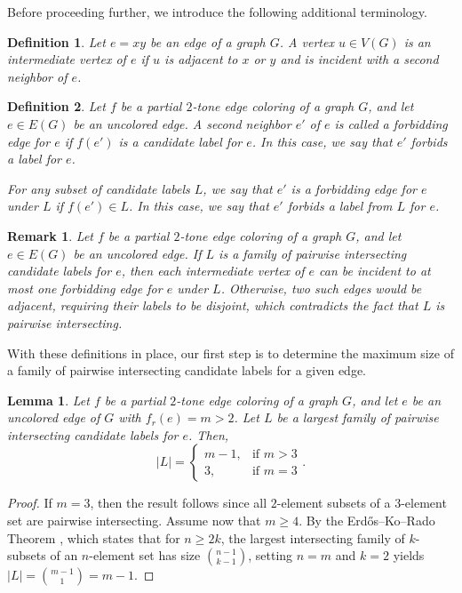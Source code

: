 \documentclass[12pt]{article}
\theoremstyle{plain}
\numberwithin{theorem}{section}
\numberwithin{conjecture}{section}
\numberwithin{corollary}{section}
\numberwithin{example}{section}
\newtheorem{lemma}{Lemma}
\numberwithin{lemma}{section}
\numberwithin{proposition}{section}
\numberwithin{problem}{section}
\newtheorem{remark}{Remark}
\numberwithin{remark}{section}
\numberwithin{claim}{theorem}
\newtheorem{definition}{Definition}
\numberwithin{definition}{section}
\begin{document}
Before proceeding further, we introduce the following additional terminology.

\begin{definition}
Let $e=xy$ be an edge of a graph $G$. A vertex $u\in V(G)$ is an \emph{intermediate vertex} of $e$ if $u$ is adjacent to $x$ or $y$ and is incident with a second neighbor of $e$.
\end{definition}

\begin{definition}
Let $f$ be a partial $2$-tone edge coloring of a graph $G$, and let $e \in E(G)$ be an uncolored edge. A second neighbor $e'$ of $e$ is called a \emph{forbidding edge} for $e$ if $f(e')$ is a candidate label for $e$. In this case, we say that $e'$ \emph{forbids} a label for $e$.

\noindent For any subset of candidate labels $L$, we say that $e'$ is a \emph{forbidding edge for $e$ under $L$} if $f(e') \in L$. In this case, we say that $e'$ \emph{forbids a label from $L$} for $e$.
\end{definition}

\begin{remark}\label{r2}
Let $f$ be a partial $2$-tone edge coloring of a graph $G$, and let $e\in E(G)$ be an uncolored edge. If $L$ is a family of pairwise intersecting candidate labels for $e$, then each intermediate vertex of $e$ can be incident to at most one forbidding edge for $e$ under $L$. Otherwise, two such edges would be adjacent, requiring their labels to be disjoint, which contradicts the fact that $L$ is pairwise intersecting.
\end{remark}

With these definitions in place, our first step is to determine the maximum size of a family of pairwise intersecting candidate labels for a given edge.

\begin{lemma}\label{p1}
Let $f$ be a partial $2$-tone edge coloring of a graph $G$, and let $e$ be an uncolored edge of $G$ with $f_r(e) = m > 2$. Let $L$ be a largest family of pairwise intersecting candidate labels for $e$. Then,
\[
|L| =
\begin{cases}
m - 1, & \text{if } m > 3 \\
3, & \text{if } m = 3
\end{cases}.
\]
\end{lemma}

\begin{proof}
If $m = 3$, then the result follows since all $2$-element subsets of a $3$-element set are pairwise intersecting. Assume now that $m \ge 4$. By the Erd\H{o}s--Ko--Rado Theorem \cite{E}, which states that for $n \ge 2k$, the largest intersecting family of $k$-subsets of an $n$-element set has size $\binom{n-1}{k-1}$, setting $n = m$ and $k = 2$ yields $|L| = \binom{m-1}{1} = m - 1$.\end{proof}
\end{document}
